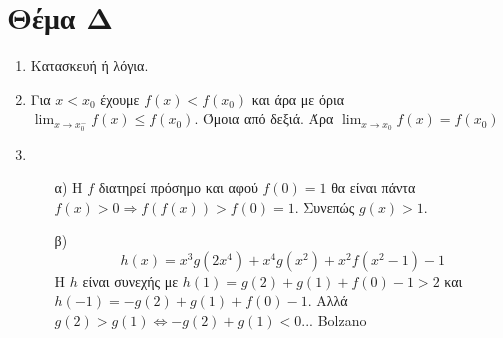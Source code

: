 \documentclass[12pt]{article}
\begin{document}
  \section*{Θέμα Δ}
    \noindent
    \begin{enumerate}
      \item Κατασκευή ή λόγια.
      \item Για $x<x_0$ έχουμε $f(x)<f(x_0)$ και άρα με όρια $\lim_{x\to x_0^-}f(x)\le f(x_0)$. Όμοια από δεξιά. Άρα $\lim_{x\to x_0}f(x)=f(x_0)$
      \item 
      \begin{enumerate}
        \item [α)] Η $f$ διατηρεί πρόσημο και αφού $f(0)=1$ θα είναι πάντα $f(x)>0 \Rightarrow f(f(x))>f(0)=1$. Συνεπώς $g(x) > 1$.
        \item [β)] $$h(x) = x^3g\left(2x^4\right)+x^4g\left(x^2\right)+x^2f\left(x^2-1\right)-1$$ Η $h$ είναι συνεχής με $h(1)=g(2)+g(1)+f(0)-1>2$ και $h(-1)=-g(2)+g(1)+f(0)-1$. Αλλά $g(2)>g(1) \iff -g(2)+g(1)<0$... Bolzano
      \end{enumerate}
    \end{enumerate}

\vspace{3\baselineskip}
\end{document}
